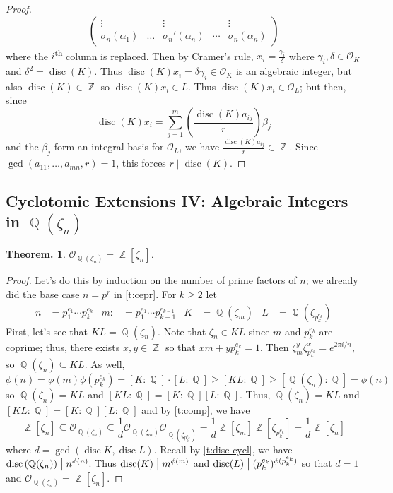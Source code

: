 \documentclass[11pt, a4paper]{memoir}
\DeclareMathOperator{\Q}{{\mathbb{Q}}}
\DeclareMathOperator{\Z}{{\mathbb{Z}}}
\renewcommand{\div}{\bigm|}
\theoremstyle{change}
\newtheorem{theorem}{Theorem.}[section]
\theoremstyle{plain}
\theoremstyle{nonumberplain}
\newtheorem{proof}{Proof}
\DeclareMathOperator{\disc}{disc}
\numberwithin{equation}{section}
\begin{document}
\begin{proof}
\begin{equation*}
\begin{pmatrix}
            \vdots&&\vdots&&\vdots\\
            \sigma_n(\alpha_1)&\hdots&\sigma_n'(\alpha_n)&\cdots&\sigma_n(\alpha_n)
        \end{pmatrix}
    \end{equation*}
    where the $i$\textsuperscript{th} column is replaced.
    Then by Cramer's rule, $x_i=\frac{\gamma_i}{\delta}$ where $\gamma_i,\delta\in\mathcal{O}_K$ and $\delta^2=\disc(K)$.
    Thus $\disc(K)x_i=\delta\gamma_i\in\mathcal{O}_K$ is an algebraic integer, but also $\disc(K)\in\Z$ so $\disc(K)x_i\in L$.
    Thus $\disc(K)x_i\in \mathcal{O}_L$; but then, since
    \begin{equation*}
        \disc(K)x_i = \sum\limits_{j=1}^m\left(\frac{\disc(K)a_{ij}}{r}\right)\beta_j
    \end{equation*}
    and the $\beta_j$ form an integral basis for $\mathcal{O}_L$, we have $\frac{\disc(K)a_{ij}}{r}\in\Z$.
    Since $\gcd(a_{11},\ldots,a_{mn},r)=1$, this forces $r\mid\disc(K)$.
\end{proof}
\subsection{Cyclotomic Extensions IV: Algebraic Integers in \texorpdfstring{$\Q(\zeta_n)$}{Qzn}}
\begin{theorem}
    $\mathcal{O}_{\Q(\zeta_n)}=\Z[\zeta_n]$.
\end{theorem}
\begin{proof}
    Let's do this by induction on the number of prime factors of $n$; we already did the base case $n=p^r$ in \cref{t:cepr}.
    For $k\geq 2$ let
    \begin{align*}
        n&=p_1^{e_1}\cdots p_k^{e_k} &
        m:&=p_1^{e_1}\cdots p_{k-1}^{e_{k-1}} &
        K&=\Q\left(\zeta_{m}\right) &
        L&=\Q\left(\zeta_{p_k^{e_k}}\right)
    \end{align*}
    First, let's see that $KL=\Q(\zeta_n)$.
    Note that $\zeta_n\in KL$ since $m$ and $p_k^{e_k}$ are coprime; thus, there exists $x,y\in\Z$ so that $xm+yp_k^{e_k}=1$.
    Then $\zeta_m^y\zeta_{p_k^{e_k}}^x=e^{2\pi i/n}$, so $\Q(\zeta_n)\subseteq KL$.
    As well,
    \begin{equation*}
        \phi(n)=\phi(m)\phi\left(p_k^{e_k}\right)=[K:\Q]\cdot[L:\Q]\geq [KL:\Q]\geq[\Q(\zeta_n):\Q]=\phi(n)
    \end{equation*}
    so $\Q(\zeta_n)=KL$ and $[KL:\Q]=[K:\Q][L:\Q]$.
    Thus, $\Q(\zeta_n)=KL$ and $[KL:\Q]=[K:\Q][L:\Q]$ and by \cref{t:comp}, we have
    \begin{equation*}
        \Z[\zeta_n]\subseteq \mathcal{O}_{\Q(\zeta_n)}\subseteq\frac{1}{d}\mathcal{O}_{\Q(\zeta_m)}\mathcal{O}_{\Q(\zeta_{p_k^{e_k}})}=\frac{1}{d}\Z[\zeta_m]\Z[\zeta_{p_k^{e_k}}]=\frac{1}{d}\Z[\zeta_n]
    \end{equation*}
    where $d=\gcd(\disc K,\disc L)$.
    Recall by \cref{t:disc-cycl}, we have $\disc\left(\Q(\zeta_n)\right)\div n^{\phi(n)}$.
    Thus $\disc(K)\div m^{\phi(m)}$ and $\disc(L)\div (p_k^{e_k})^{\phi(p_k^{e_k})}$ so that $d=1$ and $\mathcal{O}_{\Q(\zeta_n)}=\Z[\zeta_n]$.
\end{proof}
\end{document}
